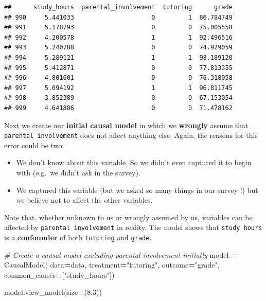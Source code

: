 \documentclass[
  12pt,
]{book}
\newenvironment{Shaded}{\begin{snugshade}}{\end{snugshade}}
\newcommand{\CommentTok}[1]{\textcolor[rgb]{0.56,0.35,0.01}{\textit{#1}}}
\newcommand{\DecValTok}[1]{\textcolor[rgb]{0.00,0.00,0.81}{#1}}
\newcommand{\NormalTok}[1]{#1}
\newcommand{\OperatorTok}[1]{\textcolor[rgb]{0.81,0.36,0.00}{\textbf{#1}}}
\newcommand{\StringTok}[1]{\textcolor[rgb]{0.31,0.60,0.02}{#1}}
\providecommand{\tightlist}{%
  \setlength{\itemsep}{0pt}\setlength{\parskip}{0pt}}
\begin{document}
\begin{verbatim}
##      study_hours  parental_involvement  tutoring      grade
## 990     5.441033                     0         1  86.784749
## 991     5.178793                     0         0  75.005558
## 992     4.200578                     1         1  92.496516
## 993     5.240788                     0         0  74.929059
## 994     5.289121                     1         1  98.189120
## 995     5.412871                     0         0  77.813355
## 996     4.801601                     0         0  76.318058
## 997     5.094192                     1         1  96.811745
## 998     3.852389                     0         0  67.153054
## 999     4.641886                     0         0  71.478162
\end{verbatim}

Next we create our \textbf{initial causal model} in which we \textbf{wrongly} assume that \texttt{parental\ involvement} does not affect anything else. Again, the reasons for this error could be two:

\begin{itemize}
\tightlist
\item
  We don't know about this variable. So we didn't even captured it to begin with (e.g.~we didn't ask in the survey).
\item
  We captured this variable (but we asked so many things in our survey !) but we believe not to affect the other variables.
\end{itemize}

Note that, whether unknown to us or wrongly assumed by us, variables can be affected by \texttt{parental\ involvement} in reality. The model shows that \texttt{study\ hours} is a \textbf{confounder} of both \texttt{tutoring} and \texttt{grade}.

\begin{Shaded}
\begin{Highlighting}[]
\CommentTok{\# Create a causal model excluding parental involvement initially}
\NormalTok{model }\OperatorTok{=}\NormalTok{ CausalModel(}
\NormalTok{    data}\OperatorTok{=}\NormalTok{data,}
\NormalTok{    treatment}\OperatorTok{=}\StringTok{"tutoring"}\NormalTok{,}
\NormalTok{    outcome}\OperatorTok{=}\StringTok{"grade"}\NormalTok{,}
\NormalTok{    common\_causes}\OperatorTok{=}\NormalTok{[}\StringTok{"study\_hours"}\NormalTok{])}

\NormalTok{model.view\_model(size}\OperatorTok{=}\NormalTok{(}\DecValTok{8}\NormalTok{,}\DecValTok{3}\NormalTok{))}
\end{Highlighting}
\end{Shaded}
\end{document}
